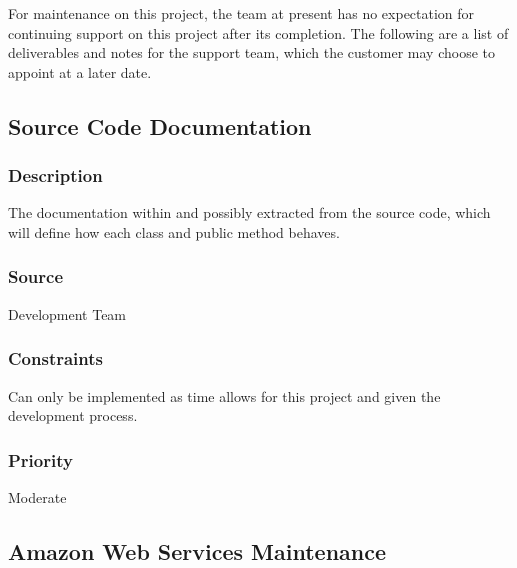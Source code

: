 For maintenance on this project, the team at present has no expectation for continuing support on this project after its completion.  The following are a list of deliverables and notes for the support team, which the customer may choose to appoint at a later date.

\subsection{Source Code Documentation}
\subsubsection{Description}
The documentation within and possibly extracted from the source code, which will define how each class and public method behaves.
\subsubsection{Source}
Development Team
\subsubsection{Constraints}
Can only be implemented as time allows for this project and given the development process.
\subsubsection{Priority}
Moderate

\subsection{Amazon Web Services Maintenance}
